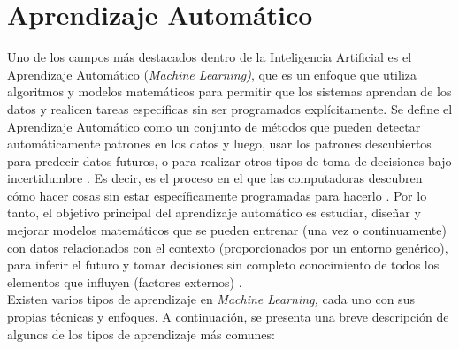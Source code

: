 \section{Aprendizaje Automático}
Uno de los campos más destacados dentro de la Inteligencia Artificial es el Aprendizaje Automático (\textit{Machine Learning)}, que es un enfoque que utiliza algoritmos y modelos matemáticos para permitir que los sistemas aprendan de los datos y realicen tareas específicas sin ser programados explícitamente. Se define el Aprendizaje Automático como un conjunto de métodos que pueden detectar automáticamente patrones en los datos y luego, usar los patrones descubiertos para predecir datos futuros, o para realizar otros tipos de toma de decisiones bajo incertidumbre \citep{murphy2012machine}. Es decir, es el proceso en el que las computadoras descubren cómo hacer cosas sin estar específicamente programadas para hacerlo \citep{Praba2021}. Por lo tanto, el objetivo principal del aprendizaje automático es estudiar, diseñar y mejorar modelos matemáticos que se pueden entrenar (una vez o continuamente) con datos relacionados con el contexto (proporcionados por un entorno genérico), para inferir el futuro y tomar decisiones sin completo conocimiento de todos los elementos que influyen (factores externos) \citep{bonaccorso2017machine}. \\
Existen varios tipos de aprendizaje en \textit{Machine Learning,} cada uno con sus propias técnicas y enfoques. A continuación, se presenta una breve descripción de algunos de los tipos de aprendizaje más comunes:
